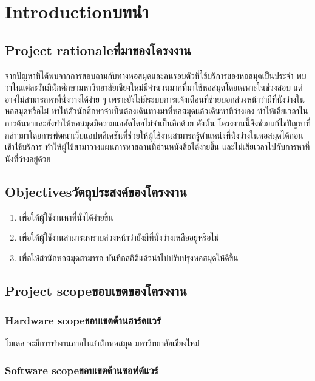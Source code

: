 \chapter{\ifenglish Introduction\else บทนำ\fi}

\section{\ifenglish Project rationale\else ที่มาของโครงงาน\fi}
จากปัญหาที่ได้พบจากการสอบถามกับทางหอสมุดและคนรอบตัวที่ใช้บริการของหอสมุดเป็นประจำ พบว่าในแต่ละวันมีนักศึกษามหาวิทยาลัยเชียงใหม่มีจำนวนมากที่มาใช้หอสมุดโดยเฉพาะในช่วงสอบ แต่อาจไม่สามารถหาที่นั่งว่างได้ง่าย ๆ 
เพราะยังไม่มีระบบการแจ้งเตือนที่ช่วยบอกล่วงหน้าว่ามีที่นั่งว่างในหอสมุดหรือไม่ ทำให้ตัวนักศึกษาจำเป็นต้องเดินทางมาที่หอสมุดแล้วเดินหาที่ว่างเอง ทำให้เสียเวลาในการค้นหาและยังทำให้หอสมุดมีความแออัดโดยไม่จำเป็นอีกด้วย
ดังนั้น โครงงานนี้จึงช่วยแก้ไขปัญหาที่กล่าวมาโดยการพัฒนาเว็บแอปพลิเคชันที่ช่วยให้ผู้ใช้งานสามารถรู้ตำแหน่งที่นั่งว่างในหอสมุดได้ก่อนเข้าใช้บริการ ทำให้ผู้ใช้สามาวางแผนการหาสถานที่อ่านหนังสือได้ง่ายขึ้น 
และไม่เสียเวลาไปกับการหาที่นั่งที่ว่างอยู่ด้วย
\section{\ifenglish Objectives\else วัตถุประสงค์ของโครงงาน\fi}
\begin{enumerate}
    \item เพื่อให้ผู้ใช้งานหาที่นั่งได้ง่ายขึ้น
    \item เพื่อให้ผู้ใช้งานสามารถทราบล่วงหน้าว่ายังมีที่นั่งว่างเหลืออยู่หรือไม่ 
    \item เพื่อให้สำนักหอสมุดสามารถ บันทึกสถิติแล้วนำไปปรับปรุงหอสมุดให้ดีขึ้น
\end{enumerate}

\section{\ifenglish Project scope\else ขอบเขตของโครงงาน\fi}

\subsection{\ifenglish Hardware scope\else ขอบเขตด้านฮาร์ดแวร์\fi}
โมเดล จะมีการทำงานภายในสำนักหอสมุด มหาวิทยาลัยเชียงใหม่
\subsection{\ifenglish Software scope\else ขอบเขตด้านซอฟต์แวร์\fi}

